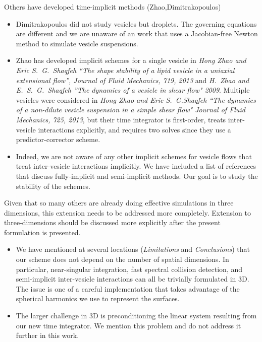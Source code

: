 \documentclass[11pt]{article}
\newcommand{\comment}[1]{{\color{blue} #1}}
\begin{document}
\comment{Others have developed time-implicit methods
(Zhao,Dimitrakopoulos)}
\begin{itemize}
  \item Dimitrakopoulos did not study vesicles but droplets.  The
  governing equations are different and we are unaware of an work that
  uses a Jacobian-free Newton method to simulate vesicle suspensions.

  \item Zhao has developed implicit schemes for a single vesicle in
  {\em Hong Zhao and Eric S.~G.~Shaqfeh ``The shape stability of a
  lipid vesicle in a uniaxial extensional flow'', Journal of Fluid
  Mechanics, 719, 2013} and {\em H.~Zhao and E.~S.~G.~Shaqfeh ''The
  dynamics of a vesicle in shear flow" 2009}.  Multiple vesicles were
  considered in {\em Hong Zhao and Eric S.~G.Shaqfeh ``The dynamics of
  a non-dilute vesicle suspension in a simple shear flow" Journal of
  Fluid Mechanics, 725, 2013}, but their time integrator is
  first-order, treats inter-vesicle interactions explicitly, and
  requires two solves since they use a predictor-corrector scheme.

  \item Indeed, we are not aware of any other implicit schemes for
  vesicle flows that treat inter-vesicle interactions implicitly.  We
  have included a list of references that discuss fully-implicit and
  semi-implicit methods. Our goal is to study the stability of the
  schemes.
  \end{itemize}

\comment{Given that so many others are already doing effective
simulations in three dimensions, this extension needs to be addressed
more completely. Extension to three-dimensions should be discussed more
explicitly after the present formulation is presented.}
\begin{itemize}
  \item We have mentioned at several locations ({\em Limitations} and
  {\em Conclusions}) that  our scheme does not depend on
  the number of spatial dimensions.  In particular, near-singular
  integration, fast spectral collision detection, and semi-implicit
  inter-vesicle interactions can all be trivially formulated in 3D.  The
  issue is one of a careful implementation that takes advantage of the
  spherical harmonics we use to represent the surfaces.

  \item The larger challenge in 3D is preconditioning the linear system
  resulting from our new time integrator.  We mention this problem and
  do not address it further in this work.
  \end{itemize}
\end{document}
